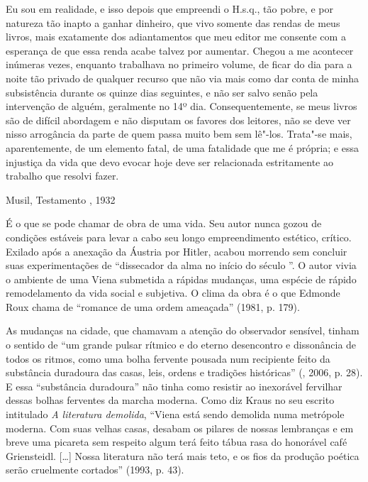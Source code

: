 \epigraph{Eu sou em realidade, e isso depois que empreendi o H.s.q., tão pobre, e
por natureza tão inapto a ganhar dinheiro, que vivo somente das rendas
de meus livros, mais exatamente dos adiantamentos que meu editor me
consente com a esperança de que essa renda acabe talvez por aumentar.
Chegou a me acontecer inúmeras vezes, enquanto trabalhava no primeiro
volume, de ficar do dia para a noite tão privado de qualquer recurso que
não via mais como dar conta de minha subsistência durante os quinze dias
seguintes, e não ser salvo senão pela intervenção de alguém, geralmente
no 14º dia. Consequentemente, se meus livros são de difícil abordagem e
não disputam os favores dos leitores, não se deve ver nisso arrogância
da parte de quem passa muito bem sem lê"-los. Trata"-se mais,
aparentemente, de um elemento fatal, de uma fatalidade que me é própria;
e essa injustiça da vida que devo evocar hoje deve ser relacionada
estritamente ao trabalho que resolvi fazer.}{Musil, Testamento , 1932}


É o que se pode chamar de obra de uma vida. Seu autor nunca gozou de
condições estáveis para levar a cabo seu longo empreendimento estético,
crítico. Exilado após a anexação da Áustria por Hitler, acabou morrendo
sem concluir suas experimentações de ``dissecador da alma no início do
século ''. O autor vivia o ambiente de uma Viena submetida a rápidas
mudanças, uma espécie de rápido remodelamento da vida social e
subjetiva. O clima da obra é o que Edmonde Roux chama de ``romance de
uma ordem ameaçada'' (1981, p. 179).

As mudanças na cidade, que chamavam a atenção do observador sensível,
tinham o sentido de ``um grande pulsar rítmico e do eterno desencontro e
dissonância de todos os ritmos, como uma bolha fervente pousada num
recipiente feito da substância duradoura das casas, leis, ordens e
tradições históricas'' (, 2006, p. 28). E essa ``substância
duradoura'' não tinha como resistir ao inexorável fervilhar dessas
bolhas ferventes da marcha moderna. Como diz Kraus no seu escrito
intitulado \emph{A literatura demolida}, ``Viena está sendo demolida
numa metrópole moderna. Com suas velhas casas, desabam os pilares de
nossas lembranças e em breve uma picareta sem respeito algum terá feito
tábua rasa do honorável café Griensteidl. [\ldots{}] Nossa
literatura não terá mais teto, e os fios da produção poética serão
cruelmente cortados'' (1993, p. 43).

